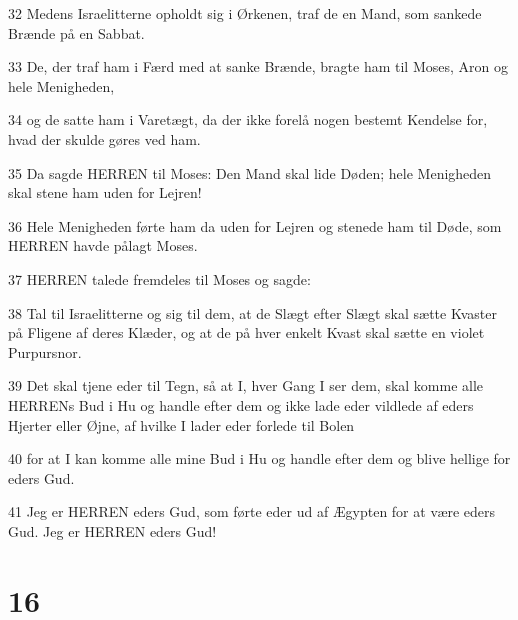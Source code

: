 \par 32 Medens Israelitterne opholdt sig i Ørkenen, traf de en Mand, som sankede Brænde på en Sabbat.
\par 33 De, der traf ham i Færd med at sanke Brænde, bragte ham til Moses, Aron og hele Menigheden,
\par 34 og de satte ham i Varetægt, da der ikke forelå nogen bestemt Kendelse for, hvad der skulde gøres ved ham.
\par 35 Da sagde HERREN til Moses: Den Mand skal lide Døden; hele Menigheden skal stene ham uden for Lejren!
\par 36 Hele Menigheden førte ham da uden for Lejren og stenede ham til Døde, som HERREN havde pålagt Moses.
\par 37 HERREN talede fremdeles til Moses og sagde:
\par 38 Tal til Israelitterne og sig til dem, at de Slægt efter Slægt skal sætte Kvaster på Fligene af deres Klæder, og at de på hver enkelt Kvast skal sætte en violet Purpursnor.
\par 39 Det skal tjene eder til Tegn, så at I, hver Gang I ser dem, skal komme alle HERRENs Bud i Hu og handle efter dem og ikke lade eder vildlede af eders Hjerter eller Øjne, af hvilke I lader eder forlede til Bolen
\par 40 for at I kan komme alle mine Bud i Hu og handle efter dem og blive hellige for eders Gud.
\par 41 Jeg er HERREN eders Gud, som førte eder ud af Ægypten for at være eders Gud. Jeg er HERREN eders Gud!

\chapter{16}

